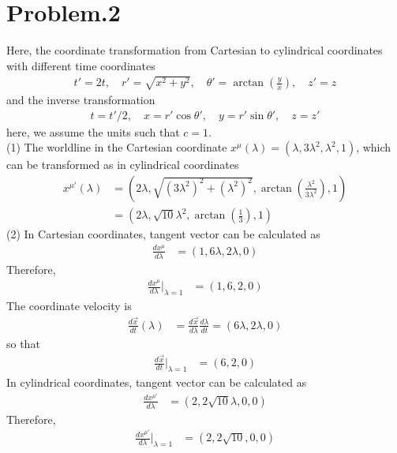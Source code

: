 \documentclass[12pt]{article}
\begin{document}
\section*{Problem.2}
Here, the coordinate transformation from Cartesian to cylindrical coordinates with different time coordinates
\begin{gather*}
t' = 2t, \quad r' = \sqrt{x^2 + y^2}, \quad \theta' = \arctan\left(\frac{y}{x}\right), \quad z' = z
\end{gather*}
and the inverse transformation
\begin{gather*}
t = t'/2, \quad x = r' \cos{\theta'}, \quad y = r' \sin{\theta'}, \quad z = z'
\end{gather*}
here, we assume the units such that $c = 1$.\\
(1)
The worldline in the Cartesian coordinate $x^{\mu}(\lambda) = \left(\lambda, 3 \lambda^2, \lambda^2, 1\right)$, which can be transformed as in cylindrical coordinates
\begin{align*}
x^{\mu'}(\lambda) &= \left(2 \lambda, \sqrt{(3 \lambda^2)^2 + (\lambda^2)^2} ,\arctan\left(\frac{\lambda^2}{3 \lambda^2}\right), 1\right)\\[1em]
&= \left(2 \lambda, \sqrt{10} \lambda^2 ,\arctan\left(\frac{1}{3}\right), 1\right)
\end{align*}
(2)
In Cartesian coordinates, tangent vector can be calculated as
\begin{align*}
\frac{d x^{\mu}}{d \lambda} &= \left(1, 6 \lambda, 2 \lambda, 0\right)
\end{align*}
Therefore,
\begin{align*}
\frac{d x^{\mu}}{d \lambda}\bigg|_{\lambda = 1} &= \left(1, 6, 2, 0\right)
\end{align*}
The coordinate velocity is
\begin{align*}
\frac{d \Vec{x}}{d t}(\lambda) &= \frac{d \Vec{x}}{d \lambda}\frac{d \lambda}{d t} = \left(6 \lambda, 2 \lambda, 0\right)
\end{align*}
so that
\begin{align*}
\frac{d \Vec{x}}{d t}\bigg|_{\lambda = 1} &= \left(6, 2, 0\right)
\end{align*}
In cylindrical coordinates, tangent vector can be calculated as
\begin{align*}
\frac{d x^{\mu'}}{d \lambda} &= \left(2, 2 \sqrt{10} \lambda , 0, 0\right)
\end{align*}
Therefore,
\begin{align*}
\frac{d x^{\mu'}}{d \lambda}\bigg|_{\lambda = 1} &= \left(2, 2 \sqrt{10}, 0, 0\right)
\end{align*}
\end{document}
